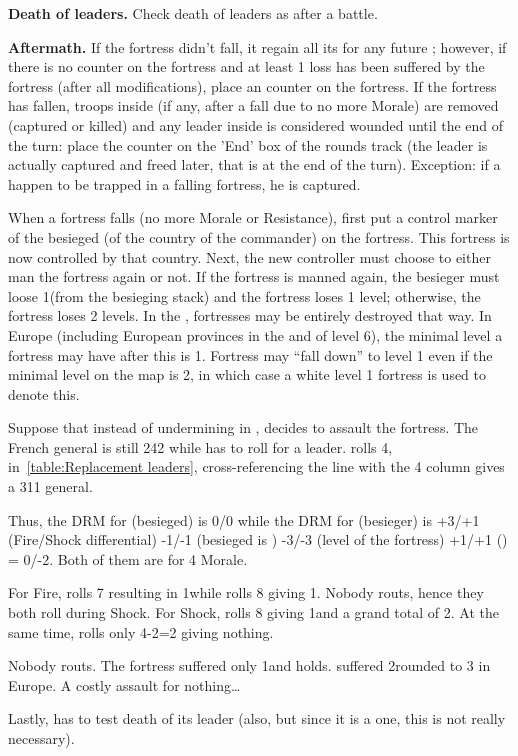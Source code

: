 \textbf{Death of leaders.} Check death of leaders as after a battle.

\textbf{Aftermath.} If the fortress didn't fall, it regain all its
 for any future ; however, if there is no
\ASSAULT counter on the fortress and at least 1 loss has been suffered by the
fortress (after all modifications), place an \ASSAULT counter on the
fortress. If the fortress has fallen, troops inside (if any, after a fall due
to no more Morale) are removed (captured or killed) and any leader inside is
considered wounded until the end of the turn: place the counter on the 'End'
box of the rounds track (the leader is actually captured and freed later, that
is at the end of the turn).  Exception: if a  happen to be
trapped in a falling fortress, he is captured.

When a fortress falls (no more Morale or Resistance), first put a control
marker of the besieged (of the country of the commander) on the fortress. This
fortress is now controlled by that country. Next, the new controller must
choose to either man the fortress again or not. If the fortress is manned
again, the besieger must loose 1\LD (from the besieging stack) and the
fortress loses 1 level; otherwise, the fortress loses 2 levels. In the \ROTW,
fortresses may be entirely destroyed that way. In Europe (including European
provinces in the \ROTW and \COL of level 6), the minimal level a fortress may
have after this is 1. Fortress may ``fall down'' to level 1 even if the
minimal level on the map is 2, in which case a white level 1 fortress is used
to denote this.

\begin{exemple}[Assault]
  Suppose that instead of undermining in \provinceArtois, \FRA decides to
  assault the fortress. The French general is still 242 while \HIS has to roll
  for a  leader. \HIS rolls 4, in~\ref{table:Replacement
    leaders}, cross-referencing the \HIS line with the 4 column gives a 311
  general.

  Thus, the DRM for \HIS (besieged) is 0/0 while the DRM for \FRA (besieger)
  is +3/+1 (Fire/Shock differential) -1/-1 (besieged is \TARQ) -3/-3 (level of
  the fortress) +1/+1 () = 0/-2. Both of them are
   for 4 Morale.

  For Fire, \HIS rolls 7 resulting in 1\textetoile while \FRA rolls 8 giving
  1\texttu\textetoile. Nobody routs, hence they both roll during Shock. For
  Shock, \HIS rolls 8 giving 1\texttd\textetoile\textetoile and a grand total
  of 2\texttd\textetoile\textetoile\textetoile. At the same time, \FRA rolls
  only 4-2=2 giving nothing.

  Nobody routs. The fortress suffered only 1\texttu and holds. \FRA suffered
  2\texttd rounded to 3 in Europe. A costly assault for nothing\ldots

  Lastly, \FRA has to test death of its leader (\HIS also, but since it is a
   one, this is not really necessary).
\end{exemple}

